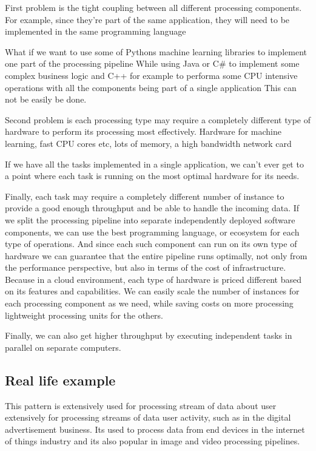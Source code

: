 First problem is the tight coupling between all different processing components.
For example, since they're part of the same application, they will need to be implemented in the same programming language

What if we want to use some of Pythons machine learning libraries to implement one part of the processing pipeline
While using Java or C\# to implement some complex business logic and C++ for example to performa some CPU intensive operations with all the components being part of a single application
This can not be easily be done.

Second problem is each processing type may require a completely different type of hardware to perform its processing most effectively.
Hardware for machine learning, fast CPU cores etc, lots of memory, a high bandwidth network card

If we have all the tasks implemented in a single application, we can't ever get to a point where each task is running on the most optimal hardware for its needs.

Finally, each task may require a completely different number of instance to provide a good enough throughput and be able to handle the incoming data.
If we split the processing pipeline into separate independently deployed software components, we can use the best programming language, or ecosystem for each type of operations.
And since each such component can run on its own type of hardware we can guarantee that the entire pipeline runs optimally, not only from the performance perspective, but also in terms of the cost of infrastructure.
Because in a cloud environment, each type of hardware is priced different based on its features and capabilities.
We can easily scale the number of instances for each processing component as we need, while saving costs on more processing lightweight processing units for the others.

Finally, we can also get higher throughput by executing independent tasks in parallel on separate computers.

\subsection{Real life example}
This pattern is extensively used for processing stream of data about user extensively for processing streams of data user activity, such as in the digital advertisement business.
Its used to process data from end devices in the internet of things industry and its also popular in image and video processing pipelines.

